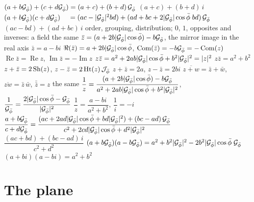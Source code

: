 \begin{gnlaws}
  {$(a + b\Gp) + (c + d\Gp) = (a + c) + (b + d)\,\Gp$}
  {$(a + c) + (b + d)\,i$}
  {$(a + b\Gp)(c + d\Gp)$ \newline $\quad = (ac - |\Gp|^2 bd) + (ad + bc + 2|\Gp|\cos\pb\;bd)\,\Gp$}
  {$(ac - bd) + (ad + bc)\,i$}
  {order, grouping, distribution; $0$, $1$, opposites and inverses: a field}
  {the same}
  {$\bar{z} = (a + 2b|\Gp|\cos\pb) - b\Gp$, the mirror image in the real axis}
  {$\bar{z} = a - bi$}
  {$\Re(\bar{z}) = a + 2b|\Gp|\cos\pb$, \quad $\Com(\bar{z}) = -b\Gp = -\Com(z)$}
  {$\operatorname{Re}\bar{z} = \operatorname{Re} z$, \newline $\operatorname{Im}\bar{z} = -\operatorname{Im} z$}
  {$z\bar{z} = a^2 + 2ab|\Gp|\cos\pb + b^2|\Gp|^2 = |z|^2$}
  {$z\bar{z} = a^2 + b^2$}
  {$z + \bar{z} = 2\Sh(z)$, \quad $z - \bar{z} = 2\Ht(z)\,\Jp$}
  {$z + \bar{z} = 2a$, \quad $z - \bar{z} = 2bi$}
  {$\overline{z + w} = \bar{z} + \bar{w}$, \quad $\overline{zw} = \bar{z}\,\bar{w}$, \quad $\bar{\bar{z}} = z$}
  {the same}
  {$\dfrac{1}{z} = \dfrac{(a + 2b|\Gp|\cos\pb) - b\Gp}{a^2 + 2ab|\Gp|\cos\pb + b^2|\Gp|^2}$, \quad $\dfrac{1}{\Gp} = \dfrac{2|\Gp|\cos\pb - \Gp}{|\Gp|^2}$}
  {$\dfrac{1}{z} = \dfrac{a - bi}{a^2 + b^2}$, \quad $\dfrac{1}{i} = -i$}
  {$\dfrac{a + b\Gp}{c + d\Gp} = \dfrac{(ac + 2ad|\Gp|\cos\pb + bd|\Gp|^2) + (bc - ad)\,\Gp}{c^2 + 2cd|\Gp|\cos\pb + d^2|\Gp|^2}$}
  {$\dfrac{(ac + bd) + (bc - ad)\,i}{c^2 + d^2}$}
  {$(a + b\Gp)(a - b\Gp) = a^2 + b^2|\Gp|^2 - 2b^2|\Gp|\cos\pb\;\Gp$}
  {$(a + bi)(a - bi) = a^2 + b^2$}
\end{gnlaws}

\section{The plane}\label{app:f-plane}

